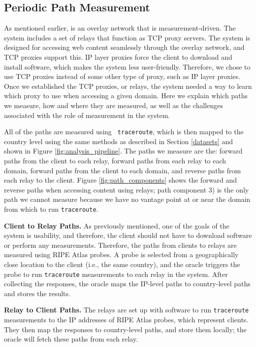 \subsection{Periodic Path Measurement}
As mentioned earlier, \system{} is an overlay network that is measurement-driven.  
The system includes a set of relays that function as TCP proxy servers.  The system 
is designed for accessing web content seamlessly through the overlay network, and 
TCP proxies support this.  IP layer proxies force the client to download and 
install software, which makes the system less user-friendly.  Therefore, we 
chose to use TCP proxies instead of some other type of proxy, such as IP layer proxies.  
Once we established the TCP proxies, or relays, the system needed a way to 
learn which proxy to use when accessing a given domain.  Here we explain which paths we measure, 
how and where they are measured, as well as the challenges associated with the 
role of measurement in the system.  

All of the paths are measured using {\tt 
traceroute}, which is then mapped to the country level using the same methods as 
described in Section \ref{datasets} and shown in Figure 
\ref{fig:analysis_pipeline}.  The paths we measure are the: forward paths from 
the client to each relay, forward paths from each relay to each domain, forward 
paths from the client to each domain, and reverse paths from each relay to the 
client. Figure \ref{fig:path_components} shows the forward and reverse paths when accessing 
content using relays; path component 3) is the only path we cannot measure because we have no 
vantage point at or near the domain from which to run {\tt traceroute}.

{\bf Client to Relay Paths.} As previously mentioned, one of the goals of the 
system is usability, and therefore, the client should not have to download software 
or perform any measurements.  Therefore, 
the paths from clients to relays are measured using RIPE Atlas probes.  A probe 
is selected from a geographically close location to the client (i.e., the same 
country), and the oracle triggers the probe to run {\tt traceroute} measurements 
to each relay in the system.  After collecting the responses, the oracle maps 
the IP-level paths to country-level paths and stores the results.

{\bf Relay to Client Paths.} The relays are set up with software to run 
{\tt traceroute} measurements to the IP addresses of RIPE Atlas probes, which 
represent clients.  They then map the responses to country-level paths, and 
store them locally; the oracle will fetch these paths from each relay. 

